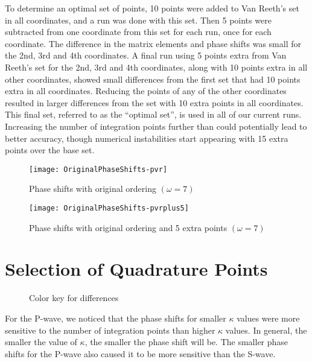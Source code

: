 \documentclass[Dissertation.tex]{subfiles}
\begin{document}
To determine an optimal set of points, 10 points were added to Van Reeth's set in all coordinates, and a run was done with this set. Then 5 points were subtracted from one coordinate from this set for each run, once for each coordinate. The difference in the matrix elements and phase shifts was small for the 2nd, 3rd and 4th coordinates. A final run using 5 points extra from Van Reeth's set for the 2nd, 3rd and 4th coordinates, along with 10 points extra in all other coordinates, showed small differences from the first set that had 10 points extra in all coordinates. Reducing the points of any of the other coordinates resulted in larger differences from the set with 10 extra points in all coordinates. This final set, referred to as the ``optimal set'', is used in all of our current runs. Increasing the number of integration points further than could potentially lead to better accuracy, though numerical instabilities start appearing with 15 extra points over the base set.


\begin{figure}[H]
	\centering
	\texttt{[image: OriginalPhaseShifts-pvr]}
	\caption{Phase shifts with original ordering $(\omega = 7)$}
	\label{fig:OriginalPhaseShifts-pvr}
\end{figure}

\begin{figure}[H]
	\centering
	\texttt{[image: OriginalPhaseShifts-pvrplus5]}
	\caption{Phase shifts with original ordering and 5 extra points $(\omega = 7)$}
	\label{fig:OriginalPhaseShifts-pvrplus5}
\end{figure}



\section{Selection of Quadrature Points}
\label{sec:SelQuadPoints2}

\begin{figure}[H]
	\caption{Color key for differences}
	\label{fig:ColorKey}
\end{figure}

For the P-wave, we noticed that the phase shifts for smaller $\kappa$ values were more sensitive to the number of integration points than higher $\kappa$ values. In general, the smaller the value of $\kappa$, the smaller the phase shift will be. The smaller phase shifts for the P-wave also caused it to be more sensitive than the S-wave.
\end{document}
